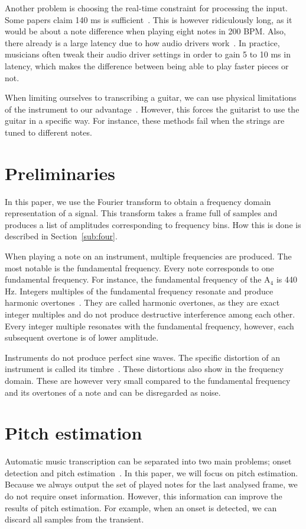 \documentclass[10pt,twocolumn]{article}
\begin{document}
Another problem is choosing the real-time constraint for processing the input. Some papers claim 140 ms is sufficient~\cite{sloomboi}. This is however ridiculously long, as it would be about a note difference when playing eight notes in 200 BPM. Also, there already is a large latency due to how audio drivers work~\cite{os}. In practice, musicians often tweak their audio driver settings in order to gain 5 to 10 ms in latency, which makes the difference between being able to play faster pieces or not.

When limiting ourselves to transcribing a guitar, we can use physical limitations of the instrument to our advantage~\cite{physical}. However, this forces the guitarist to use the guitar in a specific way. For instance, these methods fail when the strings are tuned to different notes.


\section{Preliminaries}
In this paper, we use the Fourier transform to obtain a frequency domain representation of a signal. This transform takes a frame full of samples and produces a list of amplitudes corresponding to frequency bins. How this is done is described in Section~\ref{sub:four}.

When playing a note on an instrument, multiple frequencies are produced. The most notable is the fundamental frequency. Every note corresponds to one fundamental frequency. For instance, the fundamental frequency of the $\text{A}_4$ is 440 Hz. Integers multiples of the fundamental frequency resonate and produce harmonic overtones~\cite{overtones}. They are called harmonic overtones, as they are exact integer multiples and do not produce destructive interference among each other. Every integer multiple resonates with the fundamental frequency, however, each subsequent overtone is of lower amplitude.

Instruments do not produce perfect sine waves. The specific distortion of an instrument is called its timbre~\cite{timbre}. These distortions also show in the frequency domain. These are however very small compared to the fundamental frequency and its overtones of a note and can be disregarded as noise.


\section{Pitch estimation}
Automatic music transcription can be separated into two main problems; onset detection and pitch estimation~\cite{survey2}. In this paper, we will focus on pitch estimation. Because we always output the set of played notes for the last analysed frame, we do not require onset information. However, this information can improve the results of pitch estimation. For example, when an onset is detected, we can discard all samples from the transient.
\end{document}
